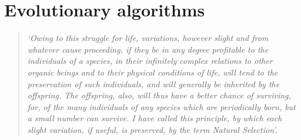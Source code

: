 \chapter{Evolutionary algorithms}
\begin{quotation}
\textit{‘Owing to this struggle for life, variations, however slight and from whatever cause proceeding, if they be in any degree profitable to the individuals of a species, in their infinitely complex relations to other organic beings and to their physical conditions of life, will tend to the preservation of such individuals, and will generally be inherited by the offspring. The offspring, also, will thus have a better chance of surviving, for, of the many individuals of any species which are periodically born, but a small number can survive. I have called this principle, by which each slight variation, if useful, is preserved, by the term Natural Selection’.} \cite[p.~115]{Knuth}
\end{quotation}

